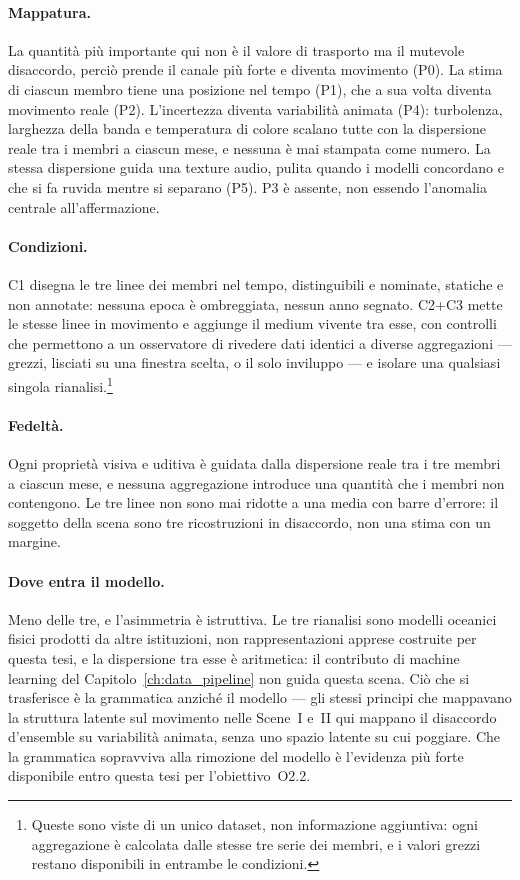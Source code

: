 \paragraph{Mappatura.} La quantità più importante qui non è il valore di trasporto ma il mutevole disaccordo, perciò prende il canale più forte e diventa movimento (P0). La stima di ciascun membro tiene una posizione nel tempo (P1), che a sua volta diventa movimento reale (P2). L'incertezza diventa variabilità animata (P4): turbolenza, larghezza della banda e temperatura di colore scalano tutte con la dispersione reale tra i membri a ciascun mese, e nessuna è mai stampata come numero. La stessa dispersione guida una texture audio, pulita quando i modelli concordano e che si fa ruvida mentre si separano (P5). P3 è assente, non essendo l'anomalia centrale all'affermazione.

\paragraph{Condizioni.} C1 disegna le tre linee dei membri nel tempo, distinguibili e nominate, statiche e non annotate: nessuna epoca è ombreggiata, nessun anno segnato. C2+C3 mette le stesse linee in movimento e aggiunge il medium vivente tra esse, con controlli che permettono a un osservatore di rivedere dati identici a diverse aggregazioni --- grezzi, lisciati su una finestra scelta, o il solo inviluppo --- e isolare una qualsiasi singola rianalisi.\footnote{Queste sono viste di un unico dataset, non informazione aggiuntiva: ogni aggregazione è calcolata dalle stesse tre serie dei membri, e i valori grezzi restano disponibili in entrambe le condizioni.}

\paragraph{Fedeltà.} Ogni proprietà visiva e uditiva è guidata dalla dispersione reale tra i tre membri a ciascun mese, e nessuna aggregazione introduce una quantità che i membri non contengono. Le tre linee non sono mai ridotte a una media con barre d'errore: il soggetto della scena sono tre ricostruzioni in disaccordo, non una stima con un margine.

\paragraph{Dove entra il modello.} Meno delle tre, e l'asimmetria è istruttiva. Le tre rianalisi sono modelli oceanici fisici prodotti da altre istituzioni, non rappresentazioni apprese costruite per questa tesi, e la dispersione tra esse è aritmetica: il contributo di machine learning del Capitolo~\ref{ch:data_pipeline} non guida questa scena. Ciò che si trasferisce è la grammatica anziché il modello --- gli stessi principi che mappavano la struttura latente sul movimento nelle Scene~I e~II qui mappano il disaccordo d'ensemble su variabilità animata, senza uno spazio latente su cui poggiare. Che la grammatica sopravviva alla rimozione del modello è l'evidenza più forte disponibile entro questa tesi per l'obiettivo~O2.2.

